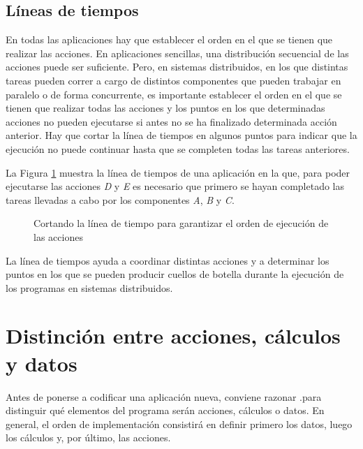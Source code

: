 \documentclass[a4paper,11pt]{extarticle}
\begin{document}
\subsection{Líneas de tiempos}
En todas las aplicaciones hay que establecer el orden en el que se tienen que realizar las acciones. En aplicaciones sencillas, una distribución secuencial de las acciones puede ser suficiente. Pero, en sistemas distribuidos, en los que distintas tareas pueden correr a cargo de distintos componentes que pueden trabajar en paralelo o de forma concurrente, es importante establecer el orden en el que se tienen que realizar todas las acciones y los puntos en los que determinadas acciones no pueden ejecutarse si antes no se ha finalizado determinada acción anterior. Hay que cortar la línea de tiempos en algunos puntos para indicar que la ejecución no puede continuar hasta que se completen todas las tareas anteriores.

La Figura \ref{fig_timeline_1} muestra la línea de tiempos de una aplicación en la que, para poder ejecutarse las acciones \textit{D} y \textit{E} es necesario que primero se hayan completado las tareas llevadas a cabo por los componentes \textit{A}, \textit{B} y \textit{C}.

\vspace{1em}
\begin{figure}[htb]
	\centering {}
	\caption{Cortando la línea de tiempo para garantizar el orden de ejecución de las acciones}
	\label{fig_timeline_1}
\end{figure}

La línea de tiempos ayuda a coordinar distintas acciones y a determinar los puntos en los que se pueden producir cuellos de botella durante la ejecución de los programas en sistemas distribuidos.

\section{Distinción entre acciones, cálculos y datos}
Antes de ponerse a codificar una aplicación nueva, conviene razonar .para distinguir qué elementos del programa serán acciones, cálculos o datos. En general, el orden de implementación consistirá en definir primero los datos, luego los cálculos y, por último, las acciones.
\end{document}
